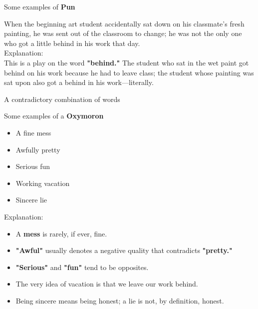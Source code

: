 \begin{example}
    Some examples of \textbf{Pun}
    
    When the beginning art student accidentally sat down on his classmate's
    fresh painting, he was sent out of the classroom to change; he was not the
    only one who got a little behind in his work that day. \\

    Explanation: \\
    
    This is a play on the word \textbf{"behind."} The student who sat in the
    wet paint got behind on his work because he had to leave class; the student
    whose painting was sat upon also got a behind in his work—literally.
\end{example}

\begin{definition}[Oxymoron]
    A contradictory combination of words
\end{definition}

\begin{example}
    Some examples of a \textbf{Oxymoron}
    
    \begin{itemize}
        \item A fine mess
        \item Awfully pretty
        \item Serious fun
        \item Working vacation
        \item Sincere lie \\
    \end{itemize}

    Explanation: \\

    \begin{itemize}
        \item A \textbf{mess} is rarely, if ever, fine.
        \item \textbf{"Awful"} usually denotes a negative quality that contradicts \textbf{"pretty."}
        \item \textbf{"Serious"} and \textbf{"fun"} tend to be opposites.
        \item The very idea of vacation is that we leave our work behind.
        \item Being sincere means being honest; a lie is not, by definition, honest.
    \end{itemize}
\end{example}

